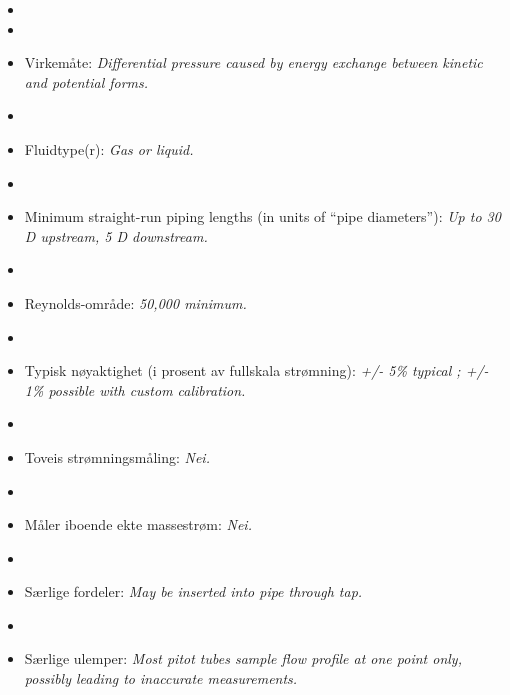 \begin{itemize}
\goodbreak
\item{} 
\vskip 5pt
\item\item{} Virkemåte: {\it Differential pressure caused by energy exchange between kinetic and potential forms.}
\vskip 5pt
\item\item{} Fluidtype(r): {\it Gas or liquid.}
\vskip 5pt
\item\item{} Minimum straight-run piping lengths (in units of ``pipe diameters''): {\it Up to 30 D upstream, 5 D downstream.}
\vskip 5pt
\item\item{} Reynolds-område: {\it 50,000 minimum.}
\vskip 5pt
\item\item{} Typisk nøyaktighet (i prosent av fullskala strømning): {\it +/- 5\% typical ; +/- 1\% possible with custom calibration.}
\vskip 5pt
\item\item{} Toveis strømningsmåling: {\it Nei.}
\vskip 5pt
\item\item{} Måler iboende ekte massestrøm: {\it Nei.}
\vskip 5pt
\item\item{} Særlige fordeler: {\it May be inserted into pipe through tap.}
\vskip 5pt
\item\item{} Særlige ulemper: {\it Most pitot tubes sample flow profile at one point only, possibly leading to inaccurate measurements.}
\end{itemize}

